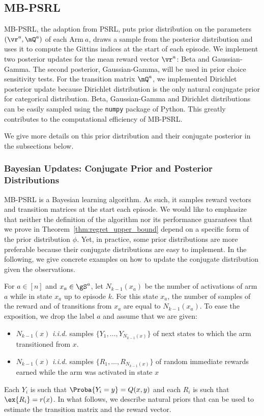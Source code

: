 \subsection{MB-PSRL}
\label{sssec:impl_gittinsPS}

MB-PSRL, the adaption from PSRL, puts prior distribution on the parameters $(\vr^a,\mQ^a)$ of each Arm$~a$, draws a sample from the posterior distribution and uses it to compute the Gittins indices at the start of each episode. We implement two posterior updates for the mean reward vector $\vr^a$: Beta and Gaussian-Gamma. The second posterior, Gaussian-Gamma, will be used in prior choice sensitivity tests. For the transition matrix $\mQ^a$, we implemented Dirichlet posterior update because Dirichlet distribution is the only natural conjugate prior for categorical distribution. Beta, Gaussian-Gamma and Dirichlet distributions can be easily sampled using the \texttt{numpy} package of Python. This greatly contributes to the computational efficiency of MB-PSRL.

We give more details on this prior distribution and their conjugate posterior in the subsections below.

\subsubsection{Bayesian Updates: Conjugate Prior and Posterior Distributions}
\label{apx:Bayes}

MB-PSRL is a Bayesian learning algorithm. 
As such, it samples reward vectors and transition matrices at the start each episode.
We would like to emphasize that neither the definition of the algorithm nor its performance guarantees that we prove in Theorem~\ref{thm:regret_upper_bound} depend on a specific form of the prior distribution $\phi$. 
Yet, in practice, some prior distributions are more preferable because their conjugate distributions are easy to implement. 
In the following, we give concrete examples on how to update the conjugate distribution given the observations. 

For $a\in[n]$ and $x_a\in\gS^a$, let $N_{k-1}(x_a)$ be the number of activations of arm $a$ while in state $x_a$ up to episode $k$. 
For this state $x_a$, the number of samples of the reward and of transitions from $x_a$ are equal to $N_{k-1}(x_a)$. 
To ease the exposition, we drop the label $a$ and assume that we are given: 
\begin{itemize}
    \item $N_{k-1}(x)$ \emph{i.i.d.} samples $\{Y_1,\dots,Y_{N_{k-1}(x)}\}$ of next states to which the arm transitioned from $x$.
    \item $N_{k-1}(x)$ \emph{i.i.d.} samples $\{R_1,\dots,R_{N_{k-1}(x)}\}$ of random immediate rewards earned while the arm was activated in state $x$
\end{itemize}
Each $Y_i$ is such that $\Proba{Y_i=y}=Q(x,y)$ and each $R_i$ is such that $\ex{R_i}=r(x)$. In what follows, we describe natural priors that can be used to estimate the transition matrix and the reward vector. 

